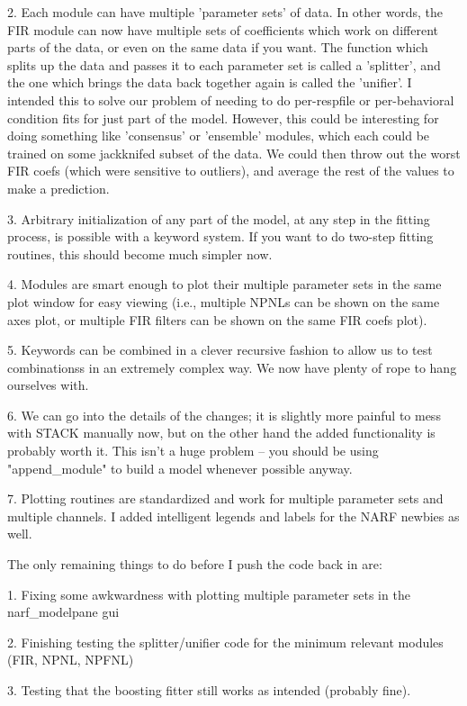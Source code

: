 {{2. Each module can have multiple 'parameter sets' of data. In other words, the FIR module can now have multiple sets of coefficients which work on different parts of the data, or even on the same data if you want. The function which splits up the data and passes it to each parameter set is called a 'splitter', and the one which brings the data back together again is called the 'unifier'. I intended this to solve our problem of needing to do per-respfile or per-behavioral condition fits for just part of the model. However, this could be interesting for doing something like 'consensus' or 'ensemble' modules, which each could be trained on some jackknifed subset of the data. We could then throw out the worst FIR coefs (which were sensitive to outliers), and average the rest of the values to make a prediction. 

3. Arbitrary initialization of any part of the model, at any step in the fitting process, is possible with a keyword system. If you want to do two-step fitting routines, this should become much simpler now. 

4. Modules are smart enough to plot their multiple parameter sets in the same plot window for easy viewing (i.e., multiple NPNLs can be shown on the same axes plot, or multiple FIR filters can be shown on the same FIR coefs plot).

5. Keywords can be combined in a clever recursive fashion to allow us to test combinationss in an extremely complex way. We now have plenty of rope to hang ourselves with.

6. We can go into the details of the changes; it is slightly more painful to mess with STACK manually now, but on the other hand the added functionality is probably worth it. This isn't a huge problem -- you should be using "append_module" to build a model whenever possible anyway. 

7. Plotting routines are standardized and work for multiple parameter sets and multiple channels. I added intelligent legends and labels for the NARF newbies as well.

The only remaining things to do before I push the code back in are:

1. Fixing some awkwardness with plotting multiple parameter sets in the narf_modelpane gui

2. Finishing testing the splitter/unifier code for the minimum relevant modules (FIR, NPNL, NPFNL)

3. Testing that the boosting fitter still works as intended (probably fine).

}}
